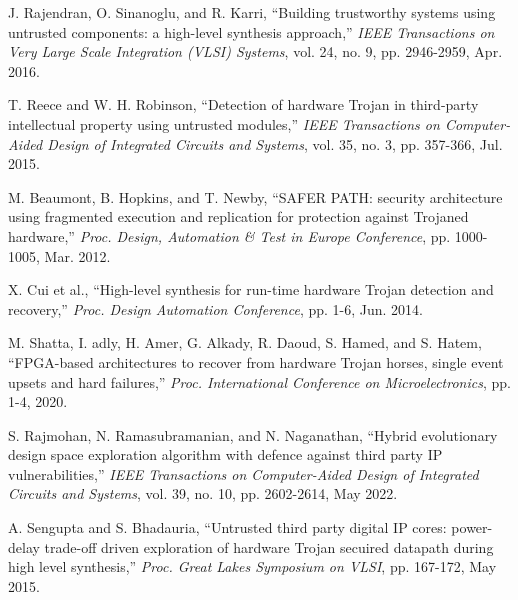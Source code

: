 \documentclass[10pt,journal, compsoc]{IEEEtran}
\begin{document}
\begin{thebibliography}{99}
J. Rajendran, O. Sinanoglu, and R. Karri, ``Building trustworthy systems using untrusted components: a high-level synthesis approach,'' \textit{IEEE Transactions on Very Large Scale Integration (VLSI) Systems}, vol. 24, no. 9, pp. 2946-2959, Apr. 2016.


T. Reece and W. H. Robinson, ``Detection of hardware Trojan in third-party intellectual property using untrusted modules,'' \textit{IEEE Transactions on Computer-Aided Design of Integrated Circuits and Systems}, vol. 35, no. 3, pp. 357-366, Jul. 2015.

M. Beaumont, B. Hopkins, and T. Newby, ``SAFER PATH: security architecture using fragmented execution and replication for protection against Trojaned hardware,'' \textit{Proc. Design, Automation \& Test in Europe Conference}, pp. 1000-1005, Mar. 2012.

X. Cui et al., ``High-level synthesis for run-time hardware Trojan detection and recovery,'' \textit{Proc. Design Automation Conference}, pp. 1-6, Jun. 2014.

M. Shatta, I. adly, H. Amer, G. Alkady, R. Daoud, S. Hamed, and S. Hatem, ``FPGA-based architectures to recover from hardware Trojan horses, single event upsets and hard failures,'' \textit{Proc. International Conference on Microelectronics}, pp. 1-4, 2020.


S. Rajmohan, N. Ramasubramanian, and N. Naganathan, ``Hybrid evolutionary design space exploration algorithm with defence against third party IP vulnerabilities,'' \textit{IEEE Transactions on Computer-Aided Design of Integrated Circuits and Systems}, vol. 39, no. 10, pp. 2602-2614, May 2022.

A. Sengupta and S. Bhadauria, ``Untrusted third party digital IP cores: power-delay trade-off driven exploration of hardware Trojan secuired datapath during high level synthesis,'' \textit{Proc. Great Lakes Symposium on VLSI}, pp. 167-172, May 2015.


\end{thebibliography}
\end{document}
